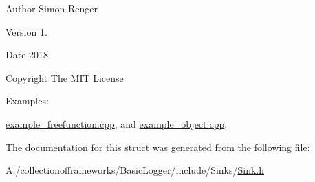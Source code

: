 \begin{DoxyAuthor}{Author}
Simon Renger 
\end{DoxyAuthor}
\begin{DoxyVersion}{Version}
1. 
\end{DoxyVersion}
\begin{DoxyDate}{Date}
2018 
\end{DoxyDate}
\begin{DoxyCopyright}{Copyright}
The M\+IT License 
\end{DoxyCopyright}
\begin{Desc}
\item[Examples\+: ]\par
\hyperlink{example_freefunction_8cpp-example}{example\+\_\+freefunction.\+cpp}, and \hyperlink{example_object_8cpp-example}{example\+\_\+object.\+cpp}.\end{Desc}


The documentation for this struct was generated from the following file\+:\begin{DoxyCompactItemize}
\item 
A\+:/collectionofframeworks/\+Basic\+Logger/include/\+Sinks/\hyperlink{_sink_8h}{Sink.\+h}\end{DoxyCompactItemize}
